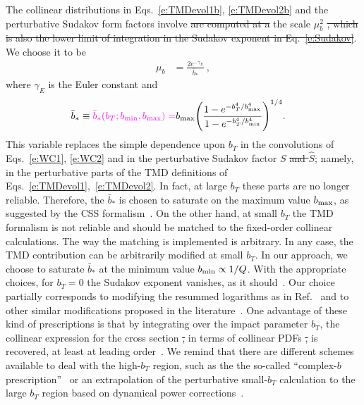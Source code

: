 \documentclass[aps,preprintnumbers,showpacs,nofootinbib,superscriptaddress,floatfix]{revtex4}
\newcommand{\AS}[1]{{\textcolor[rgb]{1,0,1}{#1}}}
\newcommand{\bT}{b_T}
\newcommand{\bb}{b}
\begin{document}
The collinear \AS{distributions} in Eqs.~\eqref{e:TMDevol1b}, \eqref{e:TMDevol2b} \AS{and the perturbative Sudakov form factors involve \sout{are computed at a} the} 
scale $\mu_b^2$ \AS{\sout{, which is also the lower limit of integration in the Sudakov
exponent in Eq.~\eqref{e:Sudakov}}}. We choose it to be
\begin{align} 
\mu_b &= \frac{2 e^{-\gamma_E}}{\bar{\bb}_{\ast}} \  ,
\label{e:mub}
\end{align}  
where $\gamma_E$ is the Euler constant and
\begin{align} 
\bar{\bb}_{\ast} &\equiv \AS{\bar{\bb}_{\ast}(b_T;\bb_{\rm min},\bb_{\rm max}) =} \bb_{\rm max} \Bigg(\frac{1-e^{- \bT^4 / \bb_{\rm max}^4} }{1-e^{- \bT^4 / \bb_{\rm min}^4}} \Bigg)^{1/4} .
\label{e:b*}
\end{align}  
This variable replaces the simple dependence upon $\bT$ in the
  convolutions of Eqs.~\eqref{e:WC1}, \eqref{e:WC2} and in the perturbative
  Sudakov factor $S$ \AS{\sout{and $\hat{S}$}}; namely, in the perturbative parts of the
  TMD definitions of Eqs.~\eqref{e:TMDevol1},~\eqref{e:TMDevol2}. In fact, at
  large $\bT$ these parts are no longer reliable. Therefore, the
  $\bar{\bb}_{\ast}$ is chosen to saturate on the maximum value $\bb_{\rm max}$,
  as suggested by the CSS 
  formalism~\cite{Collins:2011zzd,Aybat:2011zv}.
On the other hand, at
small $\bT$ the TMD formalism is not reliable and should be 
matched to the fixed-order collinear
calculations. The way
the matching is implemented is arbitrary.  In any case, the TMD contribution
can be arbitrarily modified at small $\bT$. In our approach, we choose to
saturate 
$\bar{\bb}_{\ast}$  at
the minimum value $\bb_{\rm min}\propto 1/Q$. With the appropriate choices, 
for $\bT=0$ the Sudakov exponent vanishes, as it
should~\cite{Parisi:1979se,Altarelli:1984pt}. 
Our choice partially corresponds to modifying the resummed logarithms as in
Ref.~\cite{Bozzi:2010xn} and to other similar modifications proposed in the
literature~\cite{Boer:2014tka,Collins:2016hqq}. One advantage of these kind of
prescriptions is that by integrating over the impact parameter $\bT$, the
collinear expression for the cross section \AS{\sout{,}} in terms of collinear PDFs \AS{\sout{,}} is
recovered, at least at leading order~\cite{Collins:2016hqq}.
\AS{We remind that there are different schemes available to deal with the high-$\bT$ region, such as the the so-called ``complex-$\bb$ prescription''~\cite{Laenen:2000de} or an extrapolation of the perturbative small-$b_T$ calculation to the large $b_T$ region based on dynamical power corrections~\cite{Qiu:2000hf}.}
\end{document}
